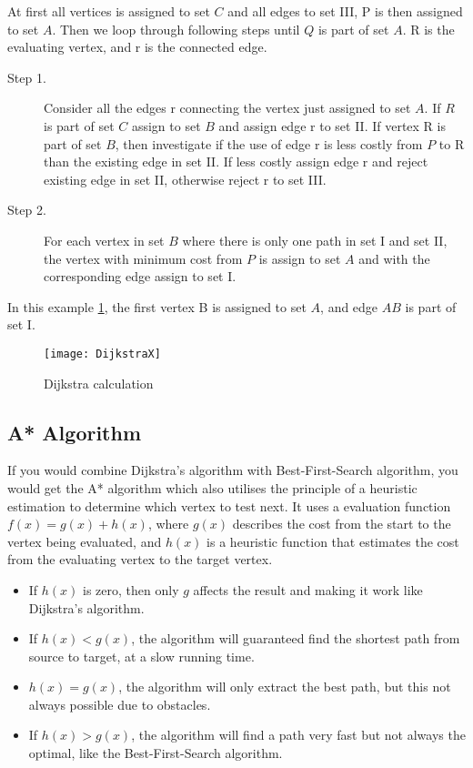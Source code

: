   At first all vertices is assigned to set $C$ and all edges to set \RN{3}, P is then assigned to set $A$.
  Then we loop through following steps until $Q$ is part of set $A$. R is the evaluating vertex, and r is the connected edge.

  \begin{description}
    \item[Step 1.]{Consider all the edges r connecting the vertex just assigned to set $A$. If $R$ is part of set $C$ assign to set $B$ and assign edge r to set \RN{2}. If vertex R is part of set $B$, then investigate if the use of edge r is less costly from $P$ to R than the existing edge in set \RN{2}. If less costly assign edge r and reject existing edge in set \RN{2}, otherwise reject r to set \RN{3}.}
    \item[Step 2.]{For each vertex in set $B$ where there is only one path in set \RN{1} and set \RN{2}, the vertex with minimum cost from $P$ is assign to set $A$ and with the corresponding edge assign to set \RN{1}.}
  \end{description}



  In this example \cref{fig:dijkstra_calc}, the first vertex B is assigned to set $A$, and edge $AB$ is part of set \RN{1}.

  \begin{figure}[ht!]
    \centering
    \texttt{[image: DijkstraX]}
    \caption{Dijkstra calculation}
    \label{fig:dijkstra_calc}
  \end{figure}

  \subsection{A* Algorithm}

  If you would combine Dijkstra's algorithm with Best-First-Search algorithm, you would get the A* algorithm which also utilises the principle of a heuristic estimation to determine which vertex to test next. It uses a evaluation function $f(x) = g(x) + h(x)$, where $g(x)$ describes the cost from the start to the vertex being evaluated, and $h(x)$ is a heuristic function that estimates the cost from the evaluating vertex to the target vertex. \cite{Patel2013}

  \begin{itemize}
    \item If $h(x)$ is zero, then only $g$ affects the result and making it work like Dijkstra's algorithm.

    \item If $h(x) < g(x)$, the algorithm will guaranteed find the shortest path from source to target, at a slow running time.

    \item $h(x) = g(x)$, the algorithm will only extract the best path, but this not always possible due to obstacles.

    \item If $h(x) > g(x)$, the algorithm will find a path very fast but not always the optimal, like the Best-First-Search algorithm.
  \end{itemize}

